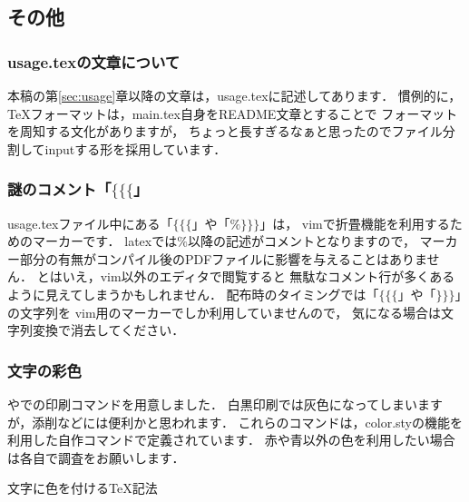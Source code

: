 \subsection{その他}

\subsubsection{usage.texの文章について}
本稿の第\ref{sec:usage}章以降の文章は，usage.texに記述してあります．
慣例的に，TeXフォーマットは，main.tex自身をREADME文章とすることで
フォーマットを周知する文化がありますが，
ちょっと長すぎるなぁと思ったのでファイル分割してinputする形を採用しています．

\subsubsection{謎のコメント「$\{\{\{$」}
usage.texファイル中にある「$\{\{\{$」や「$\%\}\}\}$」は，
vimで折畳機能を利用するためのマーカーです．
latexでは$\%$以降の記述がコメントとなりますので，
マーカー部分の有無がコンパイル後のPDFファイルに影響を与えることはありません．
とはいえ，vim以外のエディタで閲覧すると
無駄なコメント行が多くあるように見えてしまうかもしれません．
配布時のタイミングでは「$\{\{\{$」や「$\}\}\}$」の文字列を
vim用のマーカーでしか利用していませんので，
気になる場合は文字列変換で消去してください．

\subsubsection{文字の彩色}
やでの印刷コマンドを用意しました．
白黒印刷では灰色になってしまいますが，添削などには便利かと思われます．
これらのコマンドは，color.styの機能を利用した自作コマンドで定義されています．
赤や青以外の色を利用したい場合は各自で調査をお願いします．
\begin{lstbox}{文字に色を付けるTeX記法}
\begin{minilst}
\end{minilst}
\end{lstbox}


